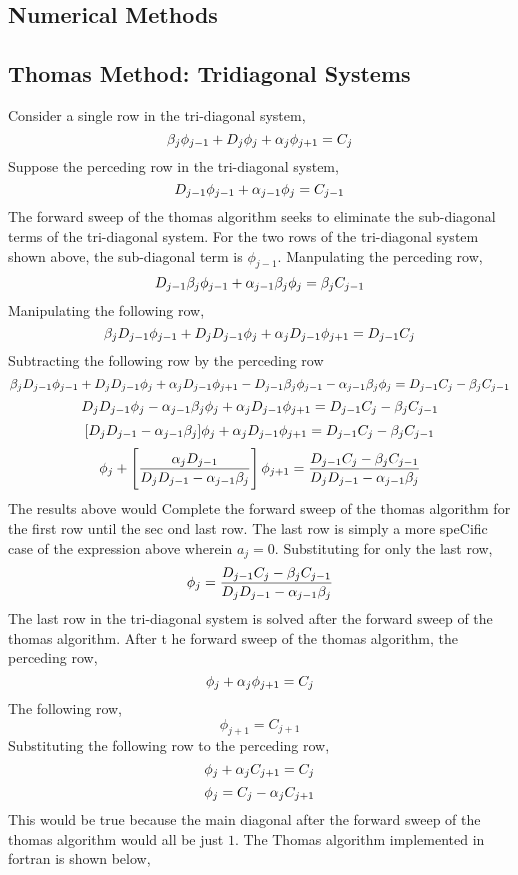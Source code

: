 \documentclass[class=report, 12pt, crop=false]{standalone}
\begin{document}
\begin{center}
\chapter{Numerical Methods}
\begin{comment}
\end{comment}
\section{Thomas Method: Tridiagonal Systems}
\begin{comment}
\end{comment}

Consider a single row in the tri-diagonal system,
$$\beta_j\phi_{j-1} + D_j\phi_{j} + \alpha_j\phi_{j+1} = C_j$$
Suppose the perceding row in the tri-diagonal system,
$$D_{j-1}\phi_{j-1} + \alpha_{j-1}\phi_{j} = C_{j-1}$$
The forward sweep of the thomas algorithm seeks to eliminate the sub-diagonal terms of the tri-diagonal system. For the two rows of the tri-diagonal system shown above, the sub-diagonal term is $\phi_{j-1}$. Manpulating the perceding row,
$$D_{j-1}\beta_j\phi_{j-1} + \alpha_{j-1}\beta_j\phi_{j} = \beta_jC_{j-1}$$
Manipulating the following row,
$$\beta_jD_{j-1}\phi_{j-1} + D_jD_{j-1}\phi_{j} + \alpha_jD_{j-1}\phi_{j+1} = D_{j-1}C_j$$
Subtracting the following row by the perceding row
$$\beta_jD_{j-1}\phi_{j-1} + D_jD_{j-1}\phi_{j} + \alpha_jD_{j-1}\phi_{j+1} - D_{j-1}\beta_j\phi_{j-1} - \alpha_{j-1}\beta_j\phi_{j} = D_{j-1}C_j - \beta_jC_{j-1}$$
$$D_jD_{j-1}\phi_{j} - \alpha_{j-1}\beta_j\phi_{j} + \alpha_jD_{j-1}\phi_{j+1} = D_{j-1}C_j - \beta_jC_{j-1}$$
$$[D_jD_{j-1} - \alpha_{j-1}\beta_j]\phi_{j} + \alpha_jD_{j-1}\phi_{j+1} = D_{j-1}C_j - \beta_jC_{j-1}$$
$$\phi_{j} + \left[\frac{\alpha_jD_{j-1}}{D_jD_{j-1} - \alpha_{j-1}\beta_j}\right]\phi_{j+1} = \frac{D_{j-1}C_j - \beta_jC_{j-1}}{D_jD_{j-1} - \alpha_{j-1}\beta_j}$$  
The results above would Complete the forward sweep of the thomas algorithm for the first row until the sec
ond last row. The last row is simply a more speCific case of the expression above wherein $a_j = 0$. Substituting for only the last row,
$$\phi_{j} = \frac{D_{j-1}C_j - \beta_jC_{j-1}}{D_jD_{j-1} - \alpha_{j-1}\beta_j}$$
The last row in the tri-diagonal system is solved after the forward sweep of the thomas algorithm. After t
he forward sweep of the thomas algorithm, the perceding row,
$$\phi_{j} + \alpha_{j}\phi_{j+1} = C_{j}$$
The following row,
$$\phi_{j+1} = C_{j+1}$$
Substituting the following row to the perceding row,
$$\phi_{j} + \alpha_{j}C_{j+1} = C_{j}$$
$$\phi_{j} = C_{j} - \alpha_{j}C_{j+1}$$
This would be true because the main diagonal after the forward sweep of the thomas algorithm would all be just $1$. The Thomas algorithm implemented in fortran is shown below,
\end{center}
\end{document}
